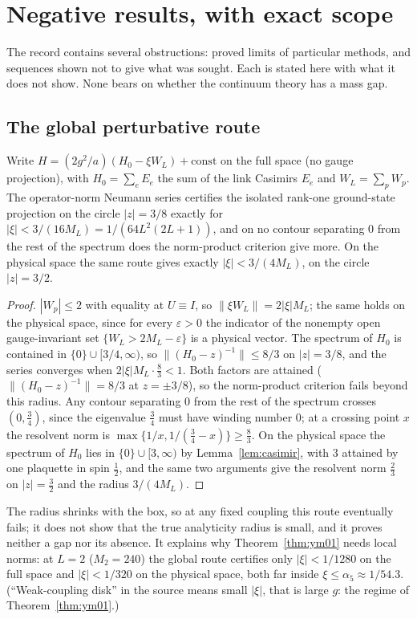 \section{Negative results, with exact scope}\label{sec:negative}

The record contains several obstructions: proved limits of particular methods, and sequences shown not to give what was sought. Each is stated here with what it does not show. None bears on whether the continuum theory has a mass gap.

\subsection{The global perturbative route}

\begin{proposition}\label{prop:neumann}
Write $H=(2g^2/a)(H_0-\xi W_L)+\mathrm{const}$ on the full space (no gauge projection), with $H_0=\sum_eE_e$ the sum of the link Casimirs $E_e$ and $W_L=\sum_pW_p$. The operator-norm Neumann series certifies the isolated rank-one ground-state projection on the circle $|z|=3/8$ exactly for $|\xi|<3/(16M_L)=1/(64L^2(2L+1))$, and on no contour separating $0$ from the rest of the spectrum does the norm-product criterion give more. On the physical space the same route gives exactly $|\xi|<3/(4M_L)$, on the circle $|z|=3/2$.
\end{proposition}
\begin{proof}
$|W_p|\le2$ with equality at $U\equiv I$, so $\|\xi W_L\|=2|\xi|M_L$; the same holds on the physical space, since for every $\varepsilon>0$ the indicator of the nonempty open gauge-invariant set $\{W_L>2M_L-\varepsilon\}$ is a physical vector. The spectrum of $H_0$ is contained in $\{0\}\cup[3/4,\infty)$, so $\|(H_0-z)^{-1}\|\le8/3$ on $|z|=3/8$, and the series converges when $2|\xi|M_L\cdot\frac83<1$. Both factors are attained ($\|(H_0-z)^{-1}\|=8/3$ at $z=\pm3/8$), so the norm-product criterion fails beyond this radius. Any contour separating $0$ from the rest of the spectrum crosses $(0,\frac34)$, since the eigenvalue $\frac34$ must have winding number $0$; at a crossing point $x$ the resolvent norm is $\max\{1/x,1/(\frac34-x)\}\ge\frac83$. On the physical space the spectrum of $H_0$ lies in $\{0\}\cup[3,\infty)$ by Lemma~\ref{lem:casimir}, with $3$ attained by one plaquette in spin $\frac12$, and the same two arguments give the resolvent norm $\frac23$ on $|z|=\frac32$ and the radius $3/(4M_L)$.
\end{proof}
The radius shrinks with the box, so at any fixed coupling this route eventually fails; it does not show that the true analyticity radius is small, and it proves neither a gap nor its absence. It explains why Theorem~\ref{thm:ym01} needs local norms: at $L=2$ ($M_2=240$) the global route certifies only $|\xi|<1/1280$ on the full space and $|\xi|<1/320$ on the physical space, both far inside $\xi\le\alpha_5\approx1/54.3$. (``Weak-coupling disk'' in the source means small $|\xi|$, that is large $g$: the regime of Theorem~\ref{thm:ym01}.)


